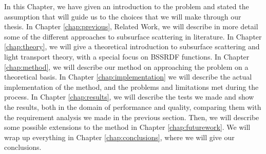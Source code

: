In this Chapter, we have given an introduction to the problem and stated the assumption that will guide us to the choices that we will make through our thesis. In Chapter \ref{chap:previous}, Related Work, we will describe in more detail some of the different approaches to subsurface scattering in literature. In Chapter \ref{chap:theory}, we will give a theoretical introduction to subsurface scattering and light transport theory, with a special focus on BSSRDF functions. In Chapter \ref{chap:method}, we will describe our method on approaching the problem on a theoretical basis. In Chapter \ref{chap:implementation} we will describe the actual implementation of the method, and the problems and limitations met during the process. In Chapter \ref{chap:results}, we will describe the tests we made and show the results, both in the domain of performance and quality, comparing them with the requirement analysis we made in the previous section. Then, we will describe some possible extensions to the method in Chapter \ref{chap:futurework}. We will wrap up everything in Chapter \ref{chap:conclusions}, where we will give our conclusions. 

